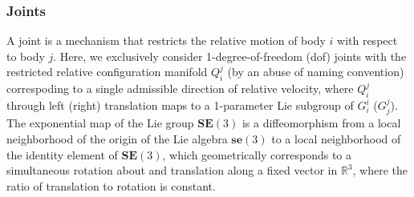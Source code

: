 \documentclass[lettersize,journal]{IEEEtran}
\def \SE {\textbf{SE}(3)}
\def \se {\textbf{se}(3)}
\def \R  {\mathbb{R}}
\begin{document}
\subsubsection{Joints} \label{joints}
A joint is a mechanism that restricts the relative motion of body $i$ with respect to body $j$.%
Here, we exclusively consider 1-degree-of-freedom (dof) joints with the restricted relative configuration manifold $Q_i^j$ (by an abuse of naming convention) correspoding to a single admissible direction of relative velocity, where $Q_i^j$ through left (right) translation maps to a 1-parameter Lie subgroup of $G_i^i$ ($G^j_j$). %
The exponential map of the Lie group $\SE$ is a diffeomorphism from a local neighborhood of the origin of the Lie algebra $\se$ to a local neighborhood of the identity element of $\SE$, which geometrically corresponds to a simultaneous rotation about and translation along a fixed vector in $\R^3$, where the ratio of translation to rotation is constant.  %
\end{document}
